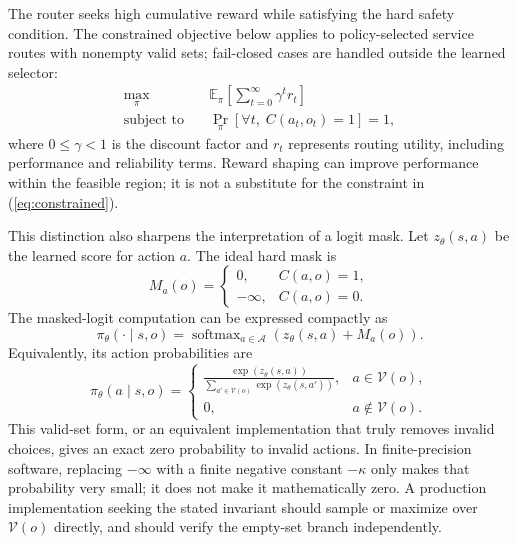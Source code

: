 \documentclass[conference]{IEEEtran}
\begin{document}
The router seeks high cumulative reward while satisfying the hard safety condition. The constrained objective below applies to policy-selected service routes with nonempty valid sets; fail-closed cases are handled outside the learned selector:
\begin{equation}
\begin{aligned}
\max_{\pi}\quad & \mathbb{E}_{\pi}\!\left[\sum_{t=0}^{\infty}\gamma^t r_t\right]\\
\text{subject to}\quad & \Pr_{\pi}\!\left[\forall t,\;C(a_t,o_t)=1\right]=1,
\end{aligned}
\label{eq:constrained}
\end{equation}
where $0\leq\gamma<1$ is the discount factor and $r_t$ represents routing utility, including performance and reliability terms. Reward shaping can improve performance within the feasible region; it is not a substitute for the constraint in (\ref{eq:constrained}).

This distinction also sharpens the interpretation of a logit mask. Let $z_{\theta}(s,a)$ be the learned score for action $a$. The ideal hard mask is
\begin{equation}
M_a(o)=
\begin{cases}
0, & C(a,o)=1,\\
-\infty, & C(a,o)=0.
\end{cases}
\label{eq:mask}
\end{equation}
The masked-logit computation can be expressed compactly as
\begin{equation}
\pi_{\theta}(\cdot\mid s,o)=\operatorname{softmax}_{a\in\mathcal{A}}(z_{\theta}(s,a)+M_a(o)).
\label{eq:maskedsoftmax}
\end{equation}
Equivalently, its action probabilities are
\begin{equation}
\pi_{\theta}(a\mid s,o)=
\begin{cases}
\displaystyle\frac{\exp(z_{\theta}(s,a))}
{\sum_{a'\in\mathcal{V}(o)}\exp(z_{\theta}(s,a'))}, & a\in\mathcal{V}(o),\\[8pt]
0, & a\notin\mathcal{V}(o).
\end{cases}
\label{eq:maskedpolicy}
\end{equation}
This valid-set form, or an equivalent implementation that truly removes invalid choices, gives an exact zero probability to invalid actions. In finite-precision software, replacing $-\infty$ with a finite negative constant $-\kappa$ only makes that probability very small; it does not make it mathematically zero. A production implementation seeking the stated invariant should sample or maximize over $\mathcal{V}(o)$ directly, and should verify the empty-set branch independently.
\end{document}
